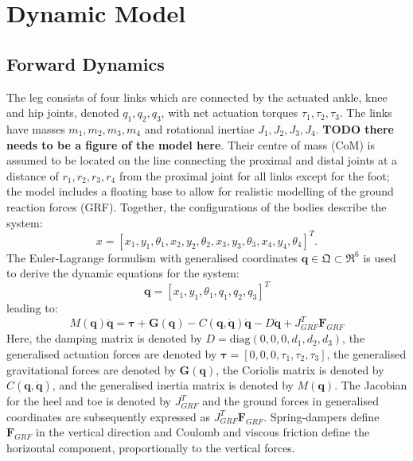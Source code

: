 \documentclass[letterpaper, 10 pt, conference]{ieeeconf}  %
\begin{document}
\section{Dynamic Model} \label{sec:dynamicModel}

\subsection{Forward Dynamics} 
The leg consists of four links which are connected by the actuated ankle, knee and hip joints, denoted $q_1,q_2,q_3$, with net actuation torques $\tau_1,\tau_2,\tau_3$. %
The links have masses $m_1,m_2,m_3,m_4$ and rotational inertiae $J_1,J_2,J_3,J_4$. \textbf{TODO there needs to be a figure of the model here}. Their centre of mass (CoM) is assumed to be located on the line connecting the proximal and distal joints at a distance of $r_1,r_2,r_3,r_4$ from the proximal joint for all links except for the foot; the model includes a floating base to allow for realistic modelling of the ground reaction forces (GRF). Together, the configurations of the bodies describe the system:
\begin{equation}
x = [x_1,y_1,\theta_1,x_2,y_2,\theta_2, x_3,y_3,\theta_3,x_4,y_4,\theta_4]^T. 
\end{equation}
The Euler-Lagrange formulism with generalised coordinates $\mathbf{q} \in \mathfrak{Q} \subset \mathfrak{R}^{6}$ is used to derive the dynamic equations for the system:
\begin{equation}
\mathbf{q}=[x_1,y_1,\theta_1,q_1,q_2,q_3]^T \label{eq:q}
\end{equation}
leading to:
\begin{equation}
M(\mathbf{q})\mathbf{\ddot q} = \mathbf{\boldsymbol{\tau} + G(q)} - C\mathbf{(q,\dot q)\dot q -} D \mathbf{\dot q} + J_{GRF}^T \mathbf{F}_{GRF}
\label{eq:fwddyn}
\end{equation}
Here, the damping matrix is denoted by $D = \text{diag} (0,0,0,d_1,d_2,d_3)$, the generalised actuation forces are denoted by $\boldsymbol{\tau} = [0,0,0,\tau_1,\tau_2,\tau_3]$, the generalised gravitational forces are denoted by $\mathbf{G(q)}$, the Coriolis matrix is denoted by $C\mathbf{(q, \dot q)}$, and the generalised inertia matrix is denoted by $M(\mathbf{q})$. The Jacobian for the heel and toe is denoted by $J_{GRF}^T$ and the ground forces in generalised coordinates are subsequently expressed as $J_{GRF}^T \mathbf{F}_{GRF}$. Spring-dampers define $\mathbf{F}_{GRF}$ in the vertical direction and Coulomb and viscous friction define the horizontal component, proportionally to the vertical forces.
\end{document}
